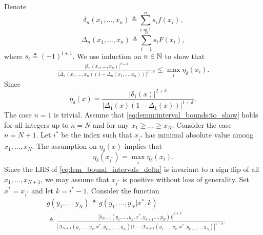 \begin{proof-of-lemma}[\ref{lem:bound_intervals_delta}]
  Denote 
  \begin{equation*}
    \delta_n(x_1,\ldots,x_n) \triangleq \sum_{i=1}^{n} s_i f(x_i),
  \end{equation*}
  \begin{equation*}
    \Delta_n(x_1,\ldots,x_n) \triangleq  \sum_{i=1}^n s_i F(x_i), 
  \end{equation*}
  where $s_i \triangleq (-1)^{i+1}$. We use induction on $n \in \mathbb{N}$ to show that 
  \begin{align}
    \label{eq:lemm:interval_bounds:to_show}
    \frac{ \left| \delta_n(x_1,\ldots,x_n) \right|^{2+\delta}} 
         {\left|\Delta_n(x_1,\ldots,x_n)\left(1- \Delta_n(x_1,\ldots,x_n) \right) \right|^{1+\delta} } \leq \max_{i}\eta_{\delta}(x_i).
  \end{align}
  Since 
  \begin{equation*}
    \eta_\delta(x) =  \frac{  \left|\delta_1(x) \right|^{2+\delta}}{\left|\Delta_1(x)
      (1-\Delta_1(x)) \right|^{1+\delta}}, 
  \end{equation*}
  The case $n=1$ is trivial.  
  Assume that \eqref{eq:lemm:interval_bounds:to_show} holds for all integers up to $n = N$ and for any $x_1 \ge \ldots \ge x_N$. Consider the case $n = N+1$. Let $i^*$ be the index such that $x_{i^*}$ has minimal absolute value among $x_1,\ldots,x_N$. The assumption on $\eta_\delta(x)$ implies that
  \begin{equation*}
    \eta_\delta(x_{i^*}) = \max_i \eta_\delta(x_i).
  \end{equation*}
  Since the LHS of \eqref{eq:lem_bound_intervals_delta} is invariant to a sign flip of all $x_1,\ldots,x_{N+1}$, we may assume that $x_{i^*}$ is positive without loss of generality. 
  Set $x^* = x_{i^*}$ and let $k=i^*-1$. Consider the function
  \begin{align}
    & g(y_1,\ldots,y_N) \triangleq g(y_1,\ldots,y_N|x^*,k) \\
    &  \triangleq  \frac{\left| \delta_{N+1}(y_1,\ldots,y_k,x^*,y_{k+1}\ldots,y_N) )\right|^{2+\delta}}{
      \left|\Delta_{N+1}(y_1,\ldots,y_k,x^*,y_{k+1}\ldots,y_N)  (1 -\Delta_{N+1}(y_1,\ldots,y_k,x^*,y_{k+1}\ldots,y_N)  \right|^{1+\delta}
    } \label{eq:g_def}.
  \end{align}

\end{proof-of-lemma}
